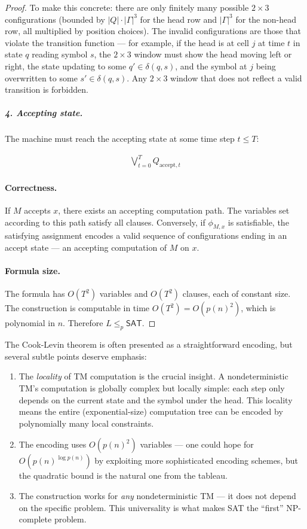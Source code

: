 \begin{proof}
To make this concrete: there are only finitely many possible $2 \times 3$ configurations (bounded by $|Q| \cdot |\Gamma|^3$ for the head row and $|\Gamma|^3$ for the non-head row, all multiplied by position choices). The invalid configurations are those that violate the transition function — for example, if the head is at cell $j$ at time $t$ in state $q$ reading symbol $s$, the $2 \times 3$ window must show the head moving left or right, the state updating to some $q' \in \delta(q,s)$, and the symbol at $j$ being overwritten to some $s' \in \delta(q,s)$. Any $2 \times 3$ window that does not reflect a valid transition is forbidden.

\subparagraph{4. Accepting state.}
The machine must reach the accepting state at some time step $t \le T$:

\begin{align*}
\bigvee_{t=0}^{T} Q_{\text{accept}, t}
\end{align*}

\paragraph{Correctness.}
If $M$ accepts $x$, there exists an accepting computation path. The variables set according to this path satisfy all clauses. Conversely, if $\phi_{M,x}$ is satisfiable, the satisfying assignment encodes a valid sequence of configurations ending in an accept state — an accepting computation of $M$ on $x$.

\paragraph{Formula size.}
The formula has $O(T^2)$ variables and $O(T^2)$ clauses, each of constant size. The construction is computable in time $O(T^2) = O(p(n)^2)$, which is polynomial in $n$. Therefore $L \le_p \mathsf{SAT}$.
\end{proof}

The Cook-Levin theorem is often presented as a straightforward encoding, but several subtle points deserve emphasis:

\begin{enumerate}
\item The \emph{locality} of TM computation is the crucial insight. A nondeterministic TM's computation is globally complex but locally simple: each step only depends on the current state and the symbol under the head. This locality means the entire (exponential-size) computation tree can be encoded by polynomially many local constraints.
\item The encoding uses $O(p(n)^2)$ variables — one could hope for $O(p(n)^{\log p(n)})$ by exploiting more sophisticated encoding schemes, but the quadratic bound is the natural one from the tableau.
\item The construction works for \emph{any} nondeterministic TM — it does not depend on the specific problem. This universality is what makes SAT the ``first'' NP-complete problem.
\end{enumerate}

